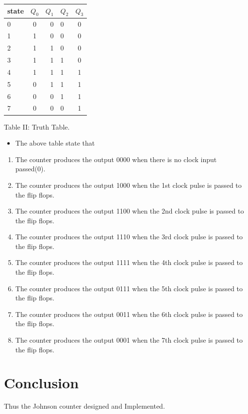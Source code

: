 \documentclass[journal,12pt,twocolumn]{IEEEtran}
\begin{document}
\begin{center}
    
    \setlength{\arrayrulewidth}{0.5mm}
\setlength{\tabcolsep}{18pt}
\renewcommand{\arraystretch}{1.5}
    \begin{tabular}{|l|c|r|l|c|}
    \hline 
      \textbf{state} & \textbf{$ Q_{0} $} & \textbf{$ Q_{1} $} & \textbf{$ Q_{2} $} & \textbf{$ Q_{3} $}
      \\
      \hline
          0&0&0&0&0
          \\ 1&1&0&0&0
          \\ 2&1&1&0&0
          \\ 3&1&1&1&0
          \\ 4&1&1&1&1
          \\ 5&0&1&1&1
          \\ 6&0&0&1&1
          \\ 7&0&0&0&1 \\
      \hline
      
   \end{tabular}
   
   \vspace{0.5cm}
   \centering Table II: Truth Table.
\label{table:2}
 \end{center}
 \begin{itemize}
 \item The above table state that
 \end{itemize}
 \begin{enumerate}
 
\item The counter produces the output 0000 when there is no clock input passed(0).
\item  The counter produces the output 1000 when the 1st clock pulse is passed to the flip flops.
 \item  The counter produces the output 1100 when the 2nd clock pulse is passed to the flip flops. \item The counter produces the output 1110 when the 3rd clock pulse is passed to the flip flops.
\item The counter produces the output 1111 when the 4th clock pulse is  passed to the flip flops.
\item  The counter produces the output 0111 when the 5th clock pulse is passed to the flip flops.
\item The counter produces the output 0011 when the 6th clock pulse is passed to the flip flops.
\item The counter produces the output 0001 when the 7th clock pulse is passed to the flip flops.
 \end{enumerate}
 
 
 \section*{Conclusion}
 Thus the Johnson counter designed and Implemented.
\end{document}
